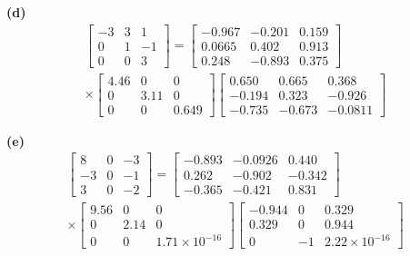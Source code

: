 \begin{resolution}
  \vspace{12pt}
  {\bf (d)}\; \begin{multline*}\begin{bmatrix}
      -3 & 3 & 1 \\ 0 & 1 & -1 \\ 0 & 0 & 3
    \end{bmatrix} = \begin{bmatrix}
      -0.967 & -0.201 & 0.159 \\
      0.0665 & 0.402  & 0.913 \\
      0.248  & -0.893 & 0.375
    \end{bmatrix} \\ \times \begin{bmatrix}
      4.46 & 0 & 0 \\ 0 & 3.11 & 0 \\ 0 & 0 & 0.649
    \end{bmatrix}  \begin{bmatrix}
      0.650 & 0.665 & 0.368 \\ -0.194 & 0.323 & -0.926 \\ -0.735 & -0.673 & -0.0811
    \end{bmatrix}\end{multline*}

  \vspace{12pt}
  {\bf (e)}\; \begin{multline*}\begin{bmatrix}
      8 & 0 & -3 \\ -3 & 0 & -1 \\ 3 & 0 & -2
    \end{bmatrix} = \begin{bmatrix}
      -0.893 & -0.0926 & 0.440  \\
      0.262  & -0.902  & -0.342 \\
      -0.365 & -0.421  & 0.831
    \end{bmatrix} \\ \times \begin{bmatrix}
      9.56 & 0 & 0 \\ 0 & 2.14 & 0 \\ 0 & 0 & 1.71 \times 10^{-16}
    \end{bmatrix}  \begin{bmatrix}
      -0.944 & 0 & 0.329 \\ 0.329 & 0 & 0.944 \\ 0 & -1 & 2.22 \times 10^{-16}
    \end{bmatrix}\end{multline*}


\end{resolution}
